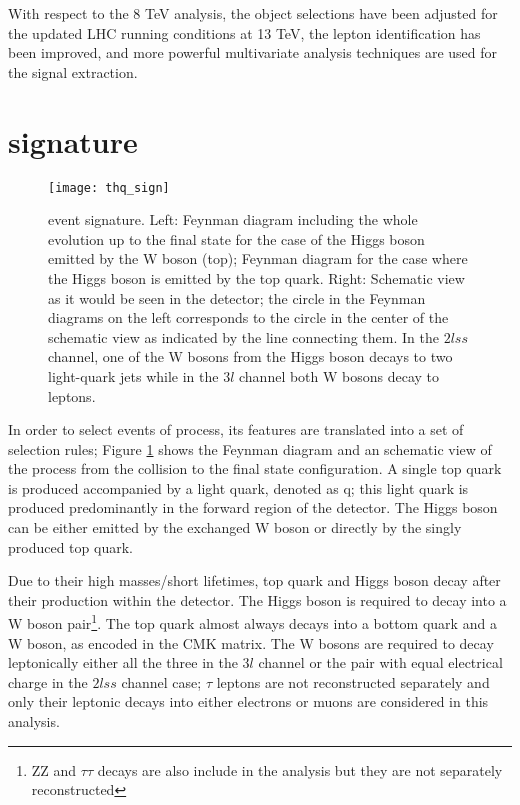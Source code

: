 With respect to the 8 TeV analysis, the object selections have been adjusted for the updated LHC running conditions at 13 TeV, the lepton identification has been improved, and more powerful multivariate analysis techniques are used for the signal extraction.


\section{\tHq signature}\label{sec:thq_sign}

\begin{figure}[!h]
\begin{center}
\texttt{[image: thq\_sign]}
\end{center}
\caption[\tHq event signature]{\tHq event signature. Left: Feynman diagram including the whole evolution up to the final state for the case of the Higgs boson emitted by the W boson (top); Feynman diagram for the case where the Higgs boson is emitted by the top quark. Right: Schematic view as it would be seen in the detector; the circle in the Feynman diagrams on the left corresponds to the circle in the center of the schematic view as indicated by the line connecting them. In the $2lss$ channel, one of the W bosons from the Higgs boson decays to two light-quark jets while in the $3l$ channel both W bosons decay to leptons.}
\label{fig:thq_sign}
\end{figure}

In order to select events of \tHq process, its features are translated into a set of selection rules; Figure \ref{fig:thq_sign} shows the Feynman diagram and an schematic view of the \tHq process from the \pp collision to the final state configuration. A single top quark is produced accompanied by a light quark, denoted as q; this light quark is produced predominantly in the forward region of the detector. The Higgs boson can be either emitted by the exchanged W boson or directly by the singly produced top quark.

Due to their high masses/short lifetimes, top quark and Higgs boson decay after their production within the detector. The Higgs boson is required to decay into a W boson pair\footnote{ZZ and $\tau\tau$ decays are also include in the analysis but they are not separately reconstructed}. The top quark almost always decays into a bottom quark and a W boson, as encoded in the CMK matrix. The W bosons are required to decay leptonically either all the three in the $3l$ channel or the pair with equal electrical charge in the $2lss$ channel case; $\tau$ leptons are not reconstructed separately and only their leptonic decays into either electrons or muons are considered in this analysis.

